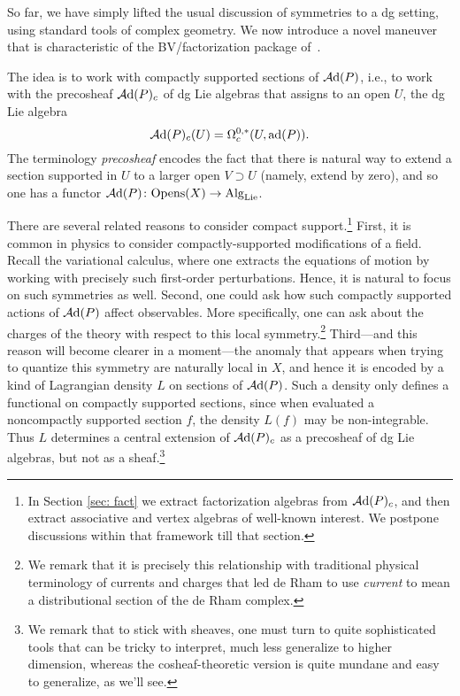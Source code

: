 So far, we have simply lifted the usual discussion of symmetries to a dg setting,
using standard tools of complex geometry.
We now introduce a novel maneuver that is characteristic of the BV/factorization package of~\cite{CG1,CG2}.

The idea is to work with compactly supported sections of $\mathcal A{\rm d}(P)$, 
i.e., to work with the precosheaf $\mathcal A{\rm d}(P)_c$ of dg Lie algebras that assigns to an open $U$,
the dg Lie algebra
\[
\mathcal A{\rm d}(P)_c(U) = \Omega^{0,*}_c(U,{\rm ad}(P)).
\]
The terminology {\em precosheaf} encodes the fact that there is natural way to extend a section supported in $U$ to a larger open $V \supset U$ (namely, extend by zero),
and so one has a functor $\mathcal A{\rm d}(P) \colon {\rm Opens}(X) \to {\rm Alg}_{\rm Lie}$.

There are several related reasons to consider compact support.\footnote{In Section \ref{sec: fact} we extract factorization algebras from $\mathcal A{\rm d}(P)_c$,
and then extract associative and vertex algebras of well-known interest.
We postpone discussions within that framework till that section.}
First, it is common in physics to consider compactly-supported modifications of a field.
Recall the variational calculus, where one extracts the equations of motion by working with precisely such first-order perturbations.
Hence, it is natural to focus on such symmetries as well.
Second, one could ask how such compactly supported actions of $\mathcal A{\rm d}(P)$ affect observables.
More specifically, one can ask about the charges of the theory with respect to this local symmetry.\footnote{We remark that it is precisely this relationship with traditional physical terminology of currents and charges that led de Rham to use {\em current} to mean a distributional section of the de Rham complex.}
Third---and this reason will become clearer in a moment---the anomaly that appears when trying to quantize this symmetry are naturally local in $X$, and hence it is encoded by a kind of Lagrangian density $L$ on sections of $\mathcal A{\rm d}(P)$.
Such a density only defines a functional on compactly supported sections,
since when evaluated a noncompactly supported section $f$, the density $L(f)$ may be non-integrable.
Thus $L$ determines a central extension of $\mathcal A{\rm d}(P)_c$ as a precosheaf of dg Lie algebras,
but not as a sheaf.\footnote{We remark that to stick with sheaves, one must turn to quite sophisticated tools \cite{WittenGr,GetzlerGM,ManBeilSch} that can be tricky to interpret, much less generalize to higher dimension, whereas the cosheaf-theoretic version is quite mundane and easy to generalize, as we'll see.}

